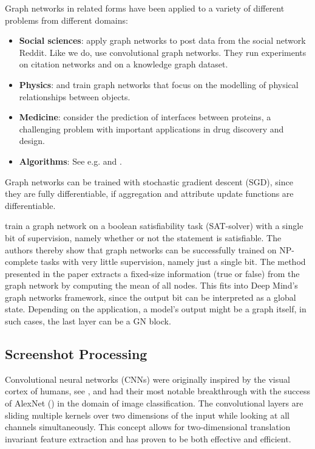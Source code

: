 Graph networks in related forms have been applied to a variety of different problems from different domains:
\begin{itemize}
    \item \textbf{Social sciences}: \cite{graphnetsreddit} apply graph networks to post data from the social network Reddit. Like we do, \cite{graphnetscitationgraph} use convolutional graph networks. They run experiments on citation networks and on a knowledge graph dataset.
    \item \textbf{Physics}: \cite{graphnetsphysicsengine} and \cite{graphnetsphysics2} train graph networks that focus on the modelling of physical relationships between objects.
    \item \textbf{Medicine}: \cite{graphnetsproteininterface} consider the prediction of interfaces between proteins, a challenging problem with important applications in drug discovery and design.
    \item \textbf{Algorithms}: See e.g. \cite{selsam:satsolver} and \cite{dai:graphnetscombinatorialalgo}.
\end{itemize}

Graph networks can be trained with stochastic gradient descent (SGD), since they are fully differentiable, if aggregation and attribute update functions are differentiable.

\cite{selsam:satsolver} train a graph network on a boolean satisfiability task (SAT-solver) with a single bit of supervision, namely whether or not the statement is satisfiable. The authors thereby show that graph networks can be successfully trained on NP-complete tasks with very little supervision, namely just a single bit. The method presented in the paper extracts a fixed-size information (true or false) from the graph network by computing the mean of all nodes. This fits into \cite{deepmind:graphnets} Deep Mind's graph networks framework, since the output bit can be interpreted as a global state. Depending on the application, a model's output might be a graph itself, in such cases, the last layer can be a GN block.


\subsection{Screenshot Processing}
\label{sec:screenshotprocessing}

Convolutional neural networks (CNNs) were originally inspired by the visual cortex of humans, see \cite{lecun:lenet}, and had their most notable breakthrough with the success of AlexNet (\cite{krizhevsky:imagenet}) in the domain of image classification. The convolutional layers are sliding multiple kernels over two dimensions of the input while looking at all channels simultaneously. This concept allows for two-dimensional translation invariant feature extraction and has proven to be both effective and efficient.


